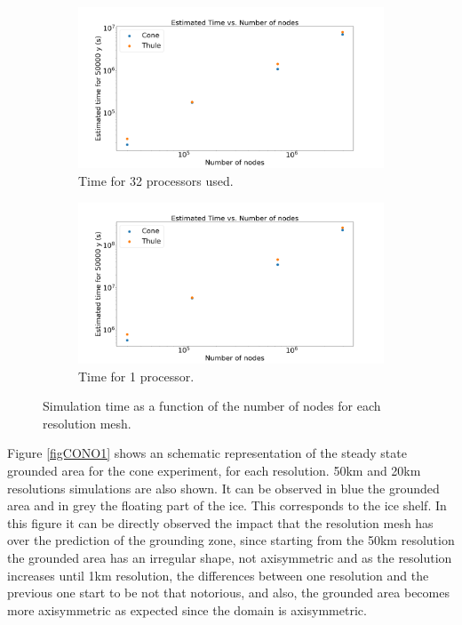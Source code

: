 \documentclass{article}
\begin{document}
\begin{figure}[!h]
	\centering
	\begin{subfigure}{.5\textwidth}
		\centering
		\includegraphics[width=1.1\linewidth]{../fig/Figure_Time_vs_nodes_Segundos.png}
		\caption{Time for 32 processors used.}
		\label{32_proce}
	\end{subfigure}%
	\begin{subfigure}{.5\textwidth}
		\centering
		\includegraphics[width=1.1\linewidth]{../fig/Figure_Time_vs_nodes_32.png}
		\caption{Time for 1 processor.}
		\label{1_proce}
	\end{subfigure}
	\caption{Simulation time as a function of the number of nodes for each resolution mesh.}
	\label{Computation time}
\end{figure}


Figure \ref{figCONO1} shows an schematic representation of the steady state grounded area for the cone experiment, for each resolution. 50km and 20km resolutions simulations are also shown. It can be observed in blue the grounded area and in grey the floating part of the ice. This corresponds to the ice shelf. In this figure it can be directly observed the impact that the resolution mesh has over the prediction of the grounding zone, since starting from the 50km resolution the grounded area has an irregular shape, not axisymmetric and as the resolution increases until 1km resolution, the differences between one resolution and the previous one start to be not that notorious, and also, the grounded area becomes more axisymmetric as expected since the domain is axisymmetric. 
\end{document}
